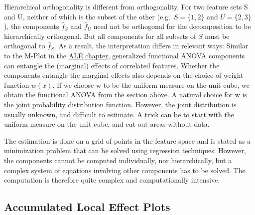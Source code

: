 \documentclass[
  10pt,
]{scrbook}
\begin{document}
Hierarchical orthogonality is different from orthogonality.
For two feature sets S and U, neither of which is the subset of the other (e.g.~\(S=\{1,2\}\) and \(U=\{2,3\}\)), the components \(\hat{f}_S\) and \(\hat{f}_U\) need not be orthogonal for the decomposition to be hierarchically orthogonal.
But all components for all subsets of \(S\) must be orthogonal to \(\hat{f}_S\).
As a result, the interpretation differs in relevant ways:
Similar to the M-Plot in the \protect\hyperlink{ale}{ALE chapter}, generalized functional ANOVA components can entangle the (marginal) effects of correlated features.
Whether the components entangle the marginal effects also depends on the choice of weight function \(w(x)\).
If we choose w to be the uniform measure on the unit cube, we obtain the functional ANOVA from the section above.
A natural choice for w is the joint probability distribution function.
However, the joint distribution is usually unknown, and difficult to estimate.
A trick can be to start with the uniform measure on the unit cube, and cut out areas without data.

The estimation is done on a grid of points in the feature space and is stated as a minimization problem that can be solved using regression techniques.
However, the components cannot be computed individually, nor hierarchically, but a complex system of equations involving other components has to be solved.
The computation is therefore quite complex and computationally intensive.

\hypertarget{accumulated-local-effect-plots}{%
\subsection{Accumulated Local Effect Plots}\label{accumulated-local-effect-plots}}
\end{document}
